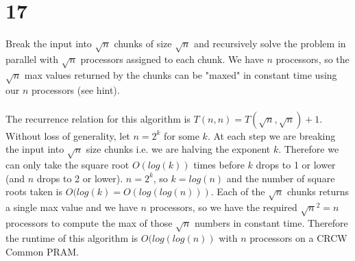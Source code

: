 \documentclass[letterpaper,notitlepage,twoside]{article}
\begin{document}
\section*{17}
Break the input into $\sqrt{n}$ chunks of size $\sqrt{n}$ and recursively solve the problem in parallel with $\sqrt{n}$ processors assigned to each chunk. We have $n$ processors, so the $\sqrt{n}$ max values returned by the chunks can be "maxed" in constant time using our $n$ processors (see hint). \\\\
The recurrence relation for this algorithm is $T(n, n) = T(\sqrt{n}, \sqrt{n}) + 1$. \\
Without loss of generality, let $n = 2^k$ for some $k$. At each step we are breaking the input into $\sqrt{n}$ size chunks i.e. we are halving the exponent $k$. Therefore we can only take the square root $O(log(k))$ times before $k$ drops to 1 or lower (and $n$ drops to 2 or lower). $n = 2^k$, so $k = log(n)$ and the number of square roots taken is $O(log(k) = O(log(log(n)))$. Each of the $\sqrt{n}$ chunks returns a single max value and we have $n$ processors, so we have the required $\sqrt{n}^2 = n$ processors to compute the max of those $\sqrt{n}$ numbers in constant time. Therefore the runtime of this algorithm is $O(log(log(n))$ with $n$ processors on a CRCW Common PRAM.
\end{document}
